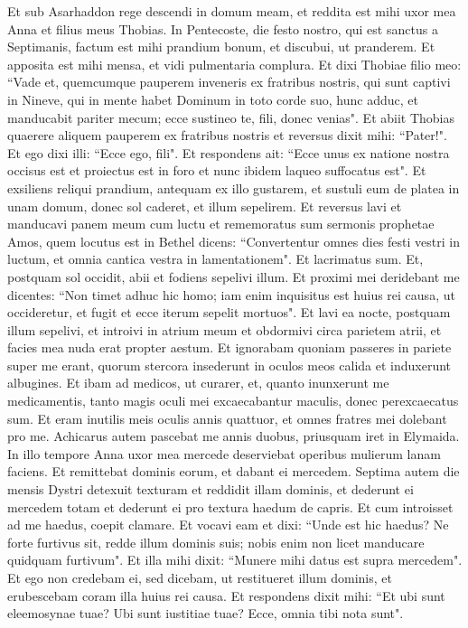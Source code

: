 \begin{biblechapter}  
\verse Et sub Asarhaddon rege descendi in domum meam, et reddita est mihi uxor mea Anna et filius meus Thobias. In Pentecoste, die festo nostro, qui est sanctus a Septimanis, factum est mihi prandium bonum, et discubui, ut pranderem. 
\verse Et apposita est mihi mensa, et vidi pulmentaria complura. Et dixi Thobiae filio meo: “Vade et, quemcumque pauperem inveneris ex fratribus nostris, qui sunt captivi in Nineve, qui in mente habet Dominum in toto corde suo, hunc adduc, et manducabit pariter mecum; ecce sustineo te, fili, donec venias".  
\verse Et abiit Thobias quaerere aliquem pauperem ex fratribus nostris et reversus dixit mihi: “Pater!". Et ego dixi illi: “Ecce ego, fili". Et respondens ait: “Ecce unus ex natione nostra occisus est et proiectus est in foro et nunc ibidem laqueo suffocatus est". 
\verse Et exsiliens reliqui prandium, antequam ex illo gustarem, et sustuli eum de platea in unam domum, donec sol caderet, et illum sepelirem. 
\verse Et reversus lavi et manducavi panem meum cum luctu 
\verse et rememoratus sum sermonis prophetae Amos, quem locutus est in Bethel dicens: “Convertentur omnes dies festi vestri in luctum, et omnia cantica vestra in lamentationem". 
\verse Et lacrimatus sum. Et, postquam sol occidit, abii et fodiens sepelivi illum.  
\verse Et proximi mei deridebant me dicentes: “Non timet adhuc hic homo; iam enim inquisitus est huius rei causa, ut occideretur, et fugit et ecce iterum sepelit mortuos". 
\verse Et lavi ea nocte, postquam illum sepelivi, et introivi in atrium meum et obdormivi circa parietem atrii, et facies mea nuda erat propter aestum. 
\verse Et ignorabam quoniam passeres in pariete super me erant, quorum stercora insederunt in oculos meos calida et induxerunt albugines. Et ibam ad medicos, ut curarer, et, quanto inunxerunt me medicamentis, tanto magis oculi mei excaecabantur maculis, donec perexcaecatus sum. Et eram inutilis meis oculis annis quattuor, et omnes fratres mei dolebant pro me. Achicarus autem pascebat me annis duobus, priusquam iret in Elymaida. 
\verse In illo tempore Anna uxor mea mercede deserviebat operibus mulierum lanam faciens. 
\verse Et remittebat dominis eorum, et dabant ei mercedem. Septima autem die mensis Dystri detexuit texturam et reddidit illam dominis, et dederunt ei mercedem totam et dederunt ei pro textura haedum de capris. 
\verse Et cum introisset ad me haedus, coepit clamare. Et vocavi eam et dixi: “Unde est hic haedus? Ne forte furtivus sit, redde illum dominis suis; nobis enim non licet manducare quidquam furtivum".  
\verse Et illa mihi dixit: “Munere mihi datus est supra mercedem". Et ego non credebam ei, sed dicebam, ut restitueret illum dominis, et erubescebam coram illa huius rei causa. Et respondens dixit mihi: “Et ubi sunt eleemosynae tuae? Ubi sunt iustitiae tuae? Ecce, omnia tibi nota sunt". 
\end{biblechapter}

